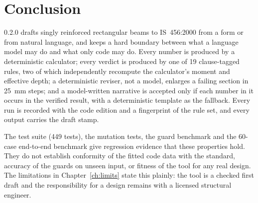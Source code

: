 \chapter{Conclusion}\label{ch:concl}

\sdcv{} 0.2.0 drafts singly reinforced rectangular beams to IS~456:2000 from a form or from natural language, and keeps a hard boundary between what a language model may do and what only code may do. Every number is produced by a deterministic calculator; every verdict is produced by one of 19 clause-tagged rules, two of which independently recompute the calculator's moment and effective depth; a deterministic reviser, not a model, enlarges a failing section in 25~mm steps; and a model-written narrative is accepted only if each number in it occurs in the verified result, with a deterministic template as the fallback. Every run is recorded with the code edition and a fingerprint of the rule set, and every output carries the draft stamp.

The test suite (449 tests), the mutation tests, the guard benchmark and the 60-case end-to-end benchmark give regression evidence that these properties hold. They do not establish conformity of the fitted code data with the standard, accuracy of the guards on unseen input, or fitness of the tool for any real design. The limitations in Chapter~\ref{ch:limits} state this plainly: the tool is a checked first draft and the responsibility for a design remains with a licensed structural engineer.
